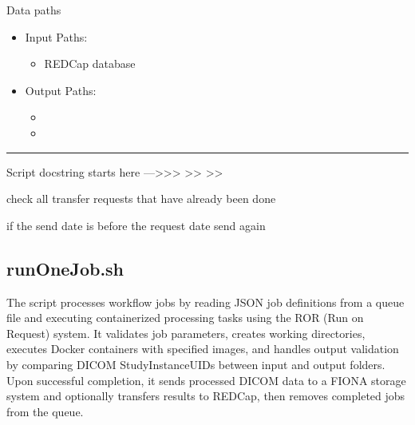 \documentclass[letterpaper,10pt,english]{sphinxmanual}
\begin{document}
\sphinxAtStartPar
{}


\sphinxAtStartPar
{}


\sphinxAtStartPar
Data paths
\begin{itemize}
\item {} 
\sphinxAtStartPar
Input Paths:
\begin{itemize}
\item {} 
\sphinxAtStartPar
REDCap database

\end{itemize}

\item {} 
\sphinxAtStartPar
Output Paths:
\begin{itemize}
\item {} 
\sphinxAtStartPar
{}

\item {} 
\sphinxAtStartPar
{}

\end{itemize}

\end{itemize}


\bigskip\hrule\bigskip


\sphinxAtStartPar
Script docstring starts here —\textgreater{}\textgreater{}\textgreater{}
\textendash{}\textgreater{}\textgreater{}
\textendash{}\textgreater{}\textgreater{}

\sphinxAtStartPar
check all transfer requests that have already been done

\sphinxAtStartPar
if the send date is before the request date send again

\sphinxstepscope


\subsection{runOneJob.sh}
\label{\detokenize{Architecture/scripts/runOneJob:runonejob-sh}}\label{\detokenize{Architecture/scripts/runOneJob::doc}}
\sphinxAtStartPar
The  script processes workflow jobs by reading JSON job definitions from a queue file and executing containerized processing tasks using the ROR (Run on Request) system. It validates job parameters, creates working directories, executes Docker containers with specified images, and handles output validation by comparing DICOM StudyInstanceUIDs between input and output folders. Upon successful completion, it sends processed DICOM data to a FIONA storage system and optionally transfers results to REDCap, then removes completed jobs from the queue.
\end{document}
